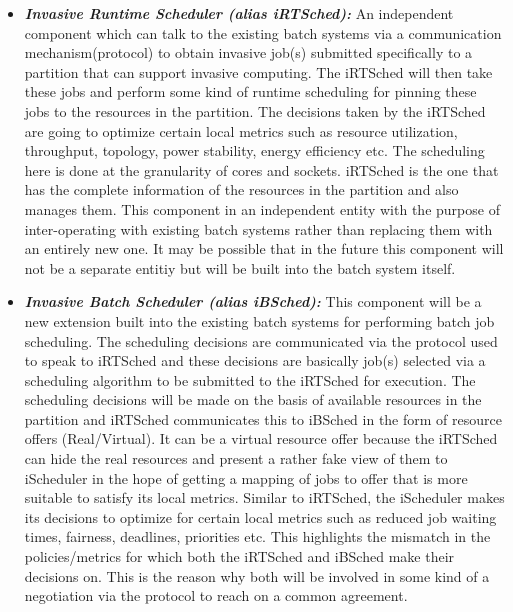 \begin{itemize}
\item \textbf{\textit{Invasive Runtime Scheduler (alias iRTSched):}} An independent component which can talk to the existing batch systems via a communication mechanism(protocol) to obtain invasive job(s) submitted specifically to a partition that can support invasive computing. The iRTSched will then take these jobs and perform some kind of runtime scheduling for pinning these jobs to the resources in the partition. The decisions taken by the iRTSched are going to optimize certain local metrics such as resource utilization, throughput, topology, power stability, energy efficiency etc. The scheduling here is done at the granularity of cores and sockets. iRTSched is the one that has the complete information of the resources in the partition and also manages them. This component in an independent entity with the purpose of inter-operating with existing batch systems rather than replacing them with an entirely new one. It may be possible that in the future this component will not be a separate entitiy but will be built into the batch system itself.
\item \textbf{\textit{Invasive Batch Scheduler (alias iBSched):}} This component will be a new extension built into the existing batch systems for performing batch job scheduling. The scheduling decisions are communicated via the protocol used to speak to iRTSched and these decisions are basically job(s) selected via a scheduling algorithm to be submitted to the iRTSched for execution. The scheduling decisions will be made on the basis of available resources in the partition and iRTSched communicates this to iBSched in the form of resource offers (Real/Virtual). It can be a virtual resource offer because the iRTSched can hide the real resources and present a rather fake view of them to iScheduler in the hope of getting a mapping of jobs to offer that is more suitable to satisfy its local metrics. Similar to iRTSched, the iScheduler makes its decisions to optimize for certain local metrics such as reduced job waiting times, fairness, deadlines, priorities etc. This highlights the mismatch in the policies/metrics for which both the iRTSched and iBSched make their decisions on. This is the reason why both will be involved in some kind of a negotiation via the protocol to reach on a common agreement.

\end{itemize}
